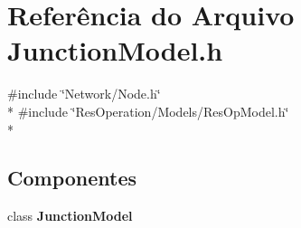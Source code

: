 \section{Referência do Arquivo Junction\+Model.\+h}
\label{_junction_model_8h}
{\ttfamily \#include \char`\"{}Network/\+Node.\+h\char`\"{}}\\*
{\ttfamily \#include \char`\"{}Res\+Operation/\+Models/\+Res\+Op\+Model.\+h\char`\"{}}\\*
\subsection*{Componentes}
\begin{DoxyCompactItemize}
\item 
class {\bf Junction\+Model}
\end{DoxyCompactItemize}
